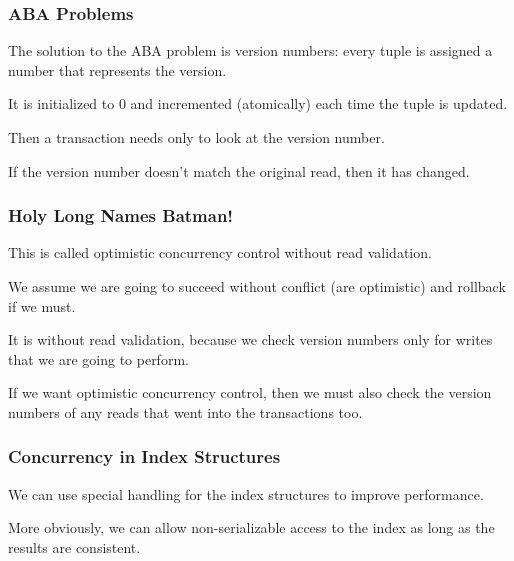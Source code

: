 \begin{frame}
\frametitle{ABA Problems}

The solution to the ABA problem is version numbers: every tuple is assigned a number that represents the version. 

It is initialized to 0 and incremented (atomically) each time the tuple is updated. 

Then a transaction needs only to look at the version number. 

If the version number doesn't match the original read, then it has changed.
\end{frame}


\begin{frame}
\frametitle{Holy Long Names Batman!}
This is called \alert{optimistic concurrency control without read validation}. 

We assume we are going to succeed without conflict (are optimistic) and rollback if we must. 

It is without read validation, because we check version numbers only for writes that we are going to perform. 

If we want optimistic concurrency control, then we must also check the version numbers of any reads that went into the transactions too.

\end{frame}

\begin{frame}
\frametitle{Concurrency in Index Structures}

We can use special handling for the index structures to improve performance. 

More obviously, we can allow non-serializable access to the index as long as the results are consistent. 


\end{frame}

